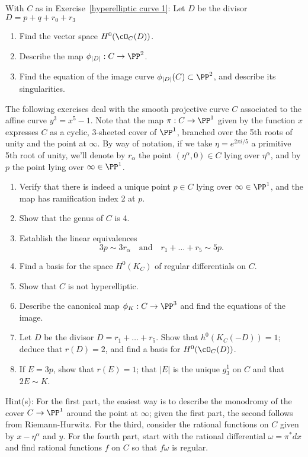 \begin{exercise}
With $C$ as in Exercise~\ref{hyperelliptic curve 1}:
Let $D$ be the divisor $D = p + q + r_0 + r_3$
\begin{enumerate}
\item Find the vector space $H^0(\cO_C(D))$.
\item Describe the map $\phi_{|D|} : C \to \PP^2$.
\item Find the equation of the image curve $\phi_{|D|}(C) \subset \PP^2$, and describe its singularities.
\end{enumerate}
\end{exercise}

The following exercises deal with the  
 smooth projective curve $C$ associated to the affine curve $y^3 = x^5 -1$. Note that the map $\pi : C \to \PP^1$ given by the function $x$ expresses $C$ as a cyclic, 3-sheeted cover of $\PP^1$, branched over the 5th roots of unity and the point at $\infty$. By way of notation, if we take $\eta = e^{2\pi i/5}$ a primitive 5th root of unity, we'll denote by $r_\alpha$ the point $(\eta^\alpha, 0) \in C$ lying over $\eta^\alpha$, and by $p$ the point lying over $\infty \in \PP^1$.


\begin{exercise}
\begin{enumerate}
\item Verify that there is indeed a unique point $p \in C$ lying over $\infty \in \PP^1$, and the map has ramification index 2 at $p$. 
\item Show that the genus of $C$ is 4.
\item Establish the linear equivalences
$$
3p \sim 3r_\alpha \quad \text{and} \quad r_1+ \dots + r_5 \sim 5p.
$$
\item Find a basis for the space $H^0(K_C)$ of regular differentials on $C$.
\item Show that $C$ is not hyperelliptic.
\item Describe the canonical map $\phi_K : C \to \PP^3$ and find the equations of the image.
\item Let $D$ be the divisor $D = r_1+\dots+r_5$. Show that $h^0(K_C(-D)) = 1$; deduce that $r(D) = 2$, and find a basis for $H^0(\cO_C(D))$.
\item If $E = 3p$, show that $r(E) = 1$; that $|E|$ is the unique $g^1_3$ on $C$ and that $2E \sim K$.
\end{enumerate}
\end{exercise}

Hint(s): For the first part, the easiest way is to describe the monodromy of the cover $C \to \PP^1$ around the point at $\infty$; given the first part, the second follows from Riemann-Hurwitz. For the third, consider the rational functions on $C$ given by $x - \eta^\alpha$ and $y$. For the fourth part, start with the rational differential $\omega = \pi^*dx$ and find rational functions $f$ on $C$ so that $f\omega$ is regular.

